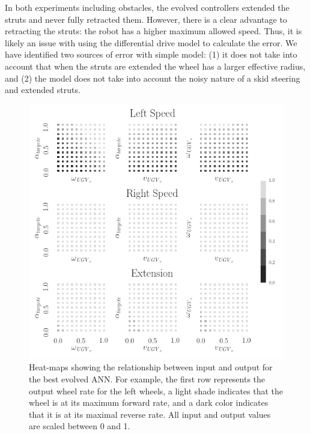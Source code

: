 In both experiments including obstacles, the evolved controllers extended the struts and never fully retracted them.
%
However, there is a clear advantage to retracting the struts: the robot has a higher maximum allowed speed.
%
Thus, it is likely an issue with using the differential drive model to calculate the error.
%
We have identified two sources of error with simple model: (1) it does not take into account that when the struts are extended the wheel has a larger effective radius, and (2) the model does not take into account the noisy nature of a skid steering and extended struts.


\begin{figure}[!ht]
    \centering

    \includegraphics[width=\columnwidth]{figures/4-results/ann_map.png}

    \caption{Heat-maps showing the relationship between input and output for the best evolved ANN. For example, the first row represents the output wheel rate for the left wheels, a light shade indicates that the wheel is at its maximum forward rate, and a dark color indicates that it is at its maximal reverse rate. All input and output values are scaled between 0 and 1.}
    \label{fig:ANN-40-2-best-ann-map}

    \vspace{-0.08in}

\end{figure}


